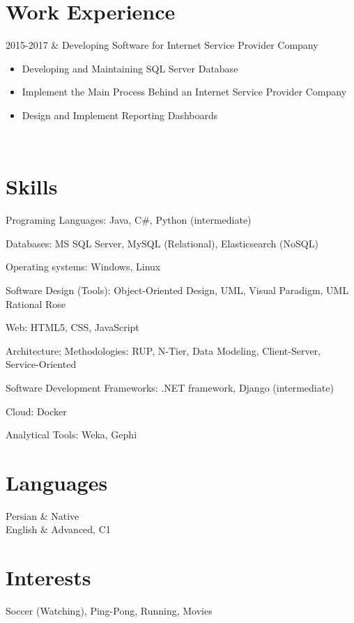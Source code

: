 \documentclass[
    changecolor={111, 156, 45}
]{cv-roald}
\begin{document}
\section*{Work Experience}
\begin{tabularcv}
2015-2017   &   
                \newline Developing Software for Internet Service Provider Company
                \begin{itemize}
                  \item Developing and Maintaining SQL Server Database
                  \item Implement the Main Process Behind an Internet Service Provider Company
                  \item Design and Implement Reporting Dashboards
                \end{itemize} 
              	\\
\end{tabularcv}   

\iffalse
	\section*{awards}
	\begin{tabularcv}
	2010        &   Winner of \emph{Turing} contest in Lancaster 
	($\pm$ 431 contenders). \link{http://someurl.com/}
	\end{tabularcv}
\fi


\section*{Skills}
Programing Languages: Java, C\#, Python (intermediate)

Databases: MS SQL Server, MySQL (Relational), Elasticsearch (NoSQL) 

Operating systems: Windows, Linux

Software Design (Tools): Object-Oriented Design, UML, Visual Paradigm, UML Rational Rose

Web: HTML5, CSS, JavaScript

Architecture; Methodologies: RUP, N-Tier, Data Modeling, Client-Server, Service-Oriented

Software Development Frameworks: .NET framework, Django (intermediate)

Cloud: Docker

Analytical Tools: Weka, Gephi

\section*{Languages}
\begin{tabularcv}
Persian     &	Native \\
English     &  	Advanced, C1 \\
\end{tabularcv}

\section*{Interests}
Soccer (Watching), Ping-Pong, Running, Movies
    
\end{document}
